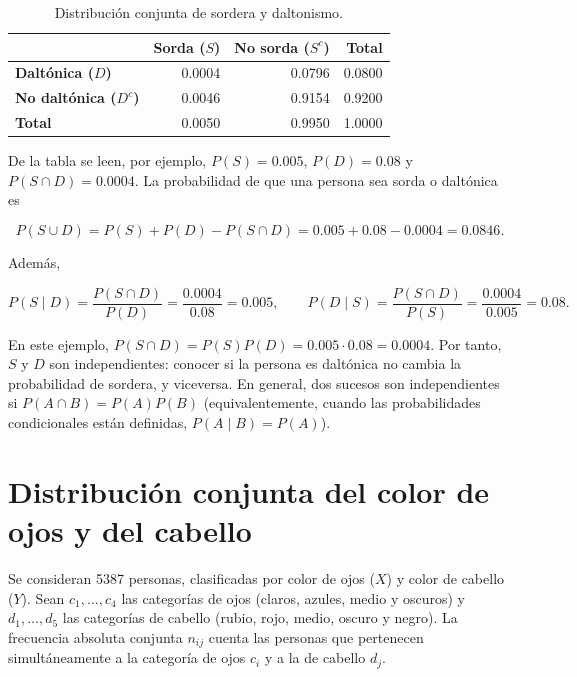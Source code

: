 \begin{table}[H]
\centering
\small
\setlength{\tabcolsep}{5pt}
\renewcommand{\arraystretch}{1.15}
\begin{tabular}{|l|r|r|r|}
\hline
 & \textbf{Sorda ($S$)} & \textbf{No sorda ($S^c$)} & \textbf{Total} \\ \hline
\textbf{Daltónica ($D$)} & 0.0004 & 0.0796 & 0.0800 \\ \hline
\textbf{No daltónica ($D^c$)} & 0.0046 & 0.9154 & 0.9200 \\ \hline
\textbf{Total} & 0.0050 & 0.9950 & 1.0000 \\ \hline
\end{tabular}
\caption{Distribución conjunta de sordera y daltonismo.}
\label{tab:sordera-daltonismo}
\end{table}

De la tabla se leen, por ejemplo, $P(S)=0.005$, $P(D)=0.08$ y $P(S\cap D)=0.0004$. La probabilidad de que una persona sea sorda o daltónica es

\begin{equation*}
P(S\cup D)=P(S)+P(D)-P(S\cap D)=0.005+0.08-0.0004=0.0846.
\end{equation*}

Además,

\begin{equation*}
P(S\mid D)=\frac{P(S\cap D)}{P(D)}=\frac{0.0004}{0.08}=0.005,
\qquad
P(D\mid S)=\frac{P(S\cap D)}{P(S)}=\frac{0.0004}{0.005}=0.08.
\end{equation*}

En este ejemplo, $P(S\cap D)=P(S)P(D)=0.005\cdot0.08=0.0004$. Por tanto, $S$ y $D$ son independientes: conocer si la persona es daltónica no cambia la probabilidad de sordera, y viceversa. En general, dos sucesos son independientes si $P(A\cap B)=P(A)P(B)$ (equivalentemente, cuando las probabilidades condicionales están definidas, $P(A\mid B)=P(A)$).

\section{Distribución conjunta del color de ojos y del cabello}

Se consideran 5387 personas, clasificadas por color de ojos ($X$) y color de cabello ($Y$). Sean $c_1,\ldots,c_4$ las categorías de ojos (claros, azules, medio y oscuros) y $d_1,\ldots,d_5$ las categorías de cabello (rubio, rojo, medio, oscuro y negro). La frecuencia absoluta conjunta $n_{ij}$ cuenta las personas que pertenecen simultáneamente a la categoría de ojos $c_i$ y a la de cabello $d_j$.

